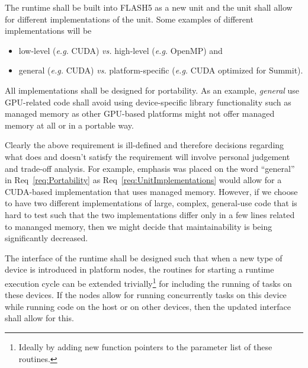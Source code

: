 \documentclass{article}
\begin{document}
\begin{req}
\label{req:UnitImplementations}
The runtime shall be built into FLASH5 as a new unit and the unit shall allow
for different implementations of the unit.  Some examples of different
implementations will be
\begin{itemize}
\item{low-level (\textit{e.g.} CUDA) \textit{vs.} high-level
(\textit{e.g.} OpenMP) and}
\item{general (\textit{e.g.} CUDA) \textit{vs.}} platform-specific
(\textit{e.g.} CUDA optimized for Summit).
\end{itemize}
\end{req}

\begin{req}
\label{req:Portability}
All implementations shall be designed for portability.  As an example,
\textit{general} use GPU-related code shall avoid using device-specific library
functionality such as managed memory as other GPU-based platforms might not
offer managed memory at all or in a portable way.
\end{req}

Clearly the above requirement is ill-defined and therefore decisions regarding
what does and doesn't satisfy the requirement will involve personal judgement
and trade-off analysis.  For example, emphasis was placed on the word
``general'' in Req~\ref{req:Portability} as Req~\ref{req:UnitImplementations}
would allow for a CUDA-based implementation that uses managed memory.  However,
if we choose to have two different implementations of large, complex,
general-use code that is hard to test such that the two implementations differ
only in a few lines related to mananged memory, then we might decide that
maintainability is being significantly decreased.

\begin{req}
The interface of the runtime shall be designed such  that when a new type of
device is introduced in platform nodes, the routines for starting a runtime
execution cycle can be extended trivially\footnote{Ideally by adding new function
pointers to the parameter list of these routines.} for including the running of
tasks on these devices.  If the nodes allow for running concurrently tasks on
this device while running code on the host or on other devices, then the updated
interface shall allow for this.
\end{req}
\end{document}
